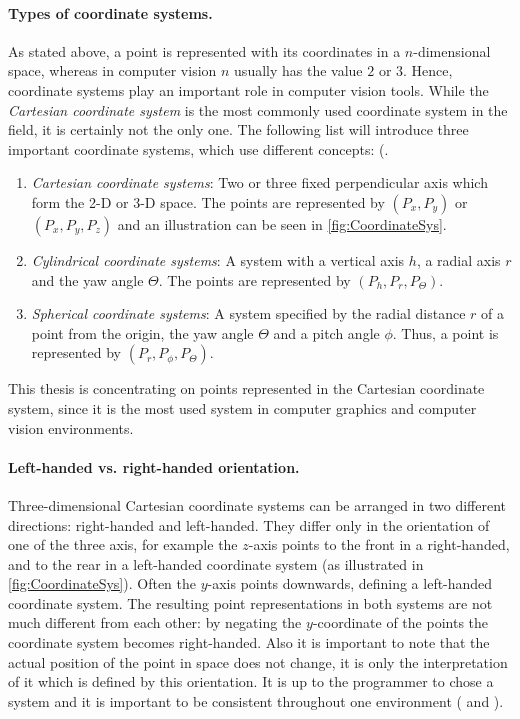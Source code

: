 \paragraph{Types of coordinate systems.}
As stated above, a point is represented with its coordinates in a $n$-dimensional space, whereas in computer vision $n$ usually has the value $2$ or $3$. Hence, coordinate systems play an important role in computer vision tools. While the \textit{Cartesian coordinate system} is the most commonly used coordinate system in the field, it is certainly not the only one. The following list will introduce three important coordinate systems, which use different concepts: (\cite[p.166 et seq.]{Gregory.2014}.  
\begin{enumerate}[i]
\item \textit{Cartesian coordinate systems}: Two or three fixed perpendicular axis which form the 2-D or 3-D space. The points are represented by $(P_x,P_y)$ or $(P_x,P_y,P_z)$ and an illustration can be seen in \autoref{fig:CoordinateSys}.  
\item \textit{Cylindrical coordinate systems}: A system with a vertical axis $h$, a radial axis $r$ and the yaw angle $\Theta$. The points are represented by $(P_h,P_r,P_\Theta)$.
\item \textit{Spherical coordinate systems}: A system specified by the radial distance $r$ of a point from the origin, the yaw angle $\Theta$ and a pitch angle $\phi$. Thus, a point is represented by $(P_r,P_\phi,P_\Theta)$.
\end{enumerate}

This thesis is concentrating on points represented in the Cartesian coordinate system, since it is the most used system in computer graphics and computer vision environments.

\paragraph{Left-handed vs. right-handed orientation.}
Three-dimensional Cartesian coordinate systems can be arranged in two different directions: right-handed and left-handed. They differ only in the orientation of one of the three axis, for example the $z$-axis points to the front in a right-handed, and to the rear in a left-handed coordinate system (as illustrated in \autoref{fig:CoordinateSys}). Often the $y$-axis points downwards, defining a left-handed coordinate system. The resulting point representations in both systems are not much different from each other: by negating the $y$-coordinate of the points the coordinate system becomes right-handed. Also it is important to note that the actual position of the point in space does not change, it is only the interpretation of it which is defined by this orientation. It is up to the programmer to chose a system and it is important to be consistent throughout one environment (\cite[p.164 et seq.]{Hartley.2011} and \cite[p.167 et seq.]{Gregory.2014}). 

